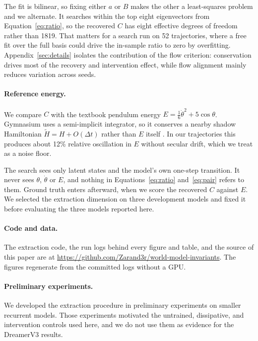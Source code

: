 The fit is bilinear, so fixing either $a$ or $B$ makes the other a least-squares problem and we
alternate. It searches within the top eight eigenvectors from Equation~\ref{eq:ratio}, so the
recovered $C$ has eight effective degrees of freedom rather than 1819. That matters for a search run
on 52 trajectories, where a free fit over the full basis could drive the in-sample ratio to zero by
overfitting. Appendix~\ref{sec:details} isolates the contribution of the flow criterion:
conservation drives most of the recovery and intervention effect, while flow alignment mainly
reduces variation across seeds.

\paragraph{Reference energy.} We compare $C$ with the textbook pendulum energy
$E = \tfrac{1}{6}\dot\theta^2 + 5\cos\theta$. Gymnasium uses a semi-implicit integrator, so it
conserves a nearby shadow Hamiltonian $\tilde H = H + O(\Delta t)$ rather than $E$ itself
\citep{hairer2006geometric}. In our trajectories this produces about 12\% relative oscillation in
$E$ without secular drift, which we treat as a noise floor.

The search sees only latent states and the model's own one-step transition. It never sees $\theta$,
$\dot\theta$ or $E$, and nothing in Equations~\ref{eq:ratio} and~\ref{eq:pair} refers to them. Ground
truth enters afterward, when we score the recovered $C$ against $E$. We selected the extraction
dimension on three development models and fixed it before evaluating the three models reported here.

\paragraph{Code and data.} The extraction code, the run logs behind every figure and table, and
the source of this paper are at \url{https://github.com/Zarand3r/world-model-invariants}. The figures
regenerate from the committed logs without a GPU.

\paragraph{Preliminary experiments.} We developed the extraction procedure in preliminary
experiments on smaller recurrent models. Those experiments motivated the untrained, dissipative, and
intervention controls used here, and we do not use them as evidence for the DreamerV3 results.
